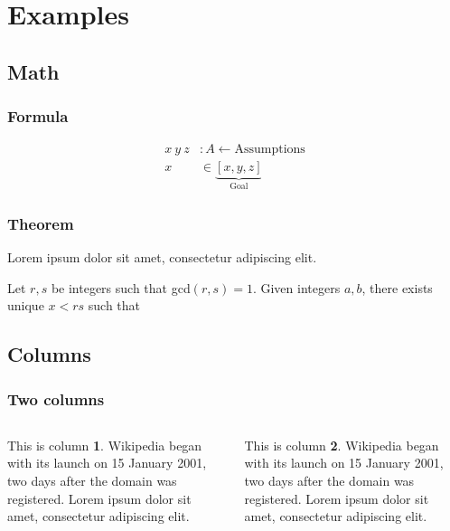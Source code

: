 \section{Examples}


\subsection{Math}


\begin{frame}
	\frametitle{Formula}
   \begin{align*}
      x\ y\ z &: A \longleftarrow \text{Assumptions}\\
      x &\in \underbrace{[x,y,z]}_{\text{Goal}}
   \end{align*}
\end{frame}


\begin{frame}
	\frametitle{Theorem}
	Lorem ipsum dolor sit amet, consectetur adipiscing elit.
    \begin{theorem}
		Let $r, s$ be integers such that gcd$(r, s)=1$.
		Given integers $a,b$, there exists unique
		$x <rs$ such that
    \end{theorem}
\end{frame}


\subsection{Columns}


\begin{frame}
	\frametitle{Two columns}
	\begin{columns}
		\begin{column}{0.48\textwidth}
			This is column \textbf{1}. Wikipedia began with its launch on 15 January 2001, two days after the domain was registered. Lorem ipsum dolor sit amet, consectetur adipiscing elit.
		\end{column}
		\begin{column}{0.48\textwidth}
			This is column \textbf{2}. Wikipedia began with its launch on 15 January 2001, two days after the domain was registered. Lorem ipsum dolor sit amet, consectetur adipiscing elit.
		\end{column}
	\end{columns}
\end{frame}



